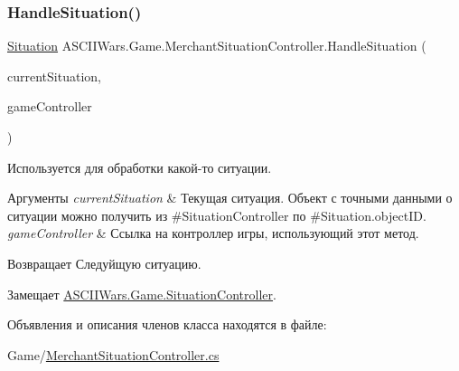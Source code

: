 \subsubsection{\texorpdfstring{Handle\+Situation()}{HandleSituation()}}
{\footnotesize\ttfamily \hyperlink{class_a_s_c_i_i_wars_1_1_game_1_1_situation}{Situation} A\+S\+C\+I\+I\+Wars.\+Game.\+Merchant\+Situation\+Controller.\+Handle\+Situation (\begin{DoxyParamCaption}\item[{\hyperlink{class_a_s_c_i_i_wars_1_1_game_1_1_situation}{Situation}}]{current\+Situation,  }\item[{\hyperlink{class_a_s_c_i_i_wars_1_1_game_1_1_game_controller}{Game\+Controller}}]{game\+Controller }\end{DoxyParamCaption})\hspace{0.3cm}{\ttfamily [inline]}}



Используется для обработки какой-\/то ситуации. 


\begin{DoxyParams}{Аргументы}
{\em current\+Situation} & Текущая ситуация. Объект с точными данными о ситуации можно получить из \#\+Situation\+Controller по \#\+Situation.\+object\+ID. \\
\hline
{\em game\+Controller} & Ссылка на контроллер игры, использующий этот метод. \\
\hline
\end{DoxyParams}
\begin{DoxyReturn}{Возвращает}
Следуйщую ситуацию. 
\end{DoxyReturn}


Замещает \hyperlink{interface_a_s_c_i_i_wars_1_1_game_1_1_situation_controller_a2cf0359dfc1683beb63f0dfed1c372e6}{A\+S\+C\+I\+I\+Wars.\+Game.\+Situation\+Controller}.



Объявления и описания членов класса находятся в файле\+:\begin{DoxyCompactItemize}
\item 
Game/\hyperlink{_merchant_situation_controller_8cs}{Merchant\+Situation\+Controller.\+cs}\end{DoxyCompactItemize}
